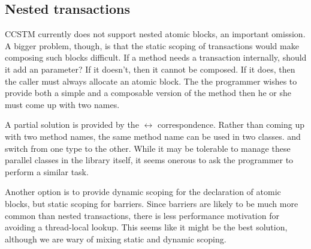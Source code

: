 \subsection{Nested transactions}

CCSTM currently does not support nested atomic blocks, an important
omission.  A bigger problem, though, is that the static scoping
of transactions would make composing such blocks difficult.  If a
method  needs a transaction internally, should it add an
  parameter?  If it doesn't, then it
cannot be composed.  If it does, then the caller must always allocate
an atomic block.  The the programmer wishes to provide both a simple
and a composable version of the method then he or she must come up with
two names.

A partial solution is provided by the  $\leftrightarrow$
 correspondence.  Rather than coming up with two
method names, the same method name can be used in two classes.
 and  switch from
one type to the other.  While it may be tolerable to manage these parallel
classes in the library itself, it seems onerous to ask the programmer to
perform a similar task.

Another option is to provide dynamic scoping for the declaration of atomic
blocks, but static scoping for barriers.  Since barriers are likely to be much
more common than nested transactions, there is less performance motivation
for avoiding a thread-local lookup.  This seems like it might be the best
solution, although we are wary of mixing static and dynamic scoping.

